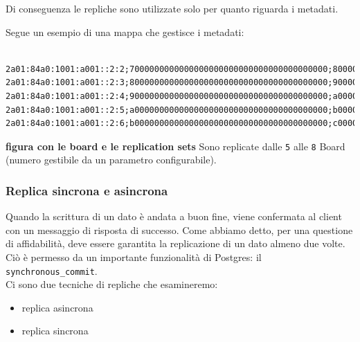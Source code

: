 Di conseguenza le repliche sono utilizzate solo per quanto riguarda i metadati. 




Segue un esempio di una mappa che gestisce i metadati:
\scriptsize
\begin{verbatim}

2a01:84a0:1001:a001::2:2;7000000000000000000000000000000000000000;8000000000000000000000000000000000000000;70000000
2a01:84a0:1001:a001::2:3;8000000000000000000000000000000000000000;9000000000000000000000000000000000000000;80000000
2a01:84a0:1001:a001::2:4;9000000000000000000000000000000000000000;a000000000000000000000000000000000000000;90000000
2a01:84a0:1001:a001::2:5;a000000000000000000000000000000000000000;b000000000000000000000000000000000000000;a0000000
2a01:84a0:1001:a001::2:6;b000000000000000000000000000000000000000;c000000000000000000000000000000000000000;b0000000

\end{verbatim}
\normalsize


\textbf{figura con le board e le replication sets}
Sono replicate dalle \verb"5" alle \verb"8" Board (numero gestibile da un parametro configurabile).


\subsubsection{Replica sincrona e asincrona}

Quando la scrittura di un dato \`{e} andata a buon fine, viene confermata al client con un messaggio di risposta di successo. Come abbiamo detto, per una questione di affidabilit\`{a}, deve essere garantita la replicazione di un dato almeno due volte. Ci\`{o} \`{e} permesso da un importante funzionalit\`{a} di Postgres: il \verb"synchronous_commit".\\

Ci sono due tecniche di repliche che esamineremo: 
\begin{itemize}
\item 
replica asincrona 
\item
replica sincrona
\end{itemize}


